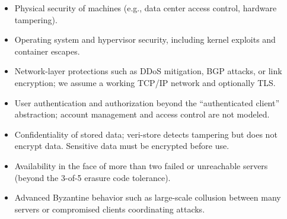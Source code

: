 \documentclass[../veristore_security_model.tex]{subfiles}
\begin{document}
\begin{itemize}
    \item Physical security of machines (e.g., data center access control, hardware tampering).
    \item Operating system and hypervisor security, including kernel exploits and container escapes.
    \item Network-layer protections such as DDoS mitigation, BGP attacks, or link encryption; we assume a working TCP/IP network and optionally TLS.
    \item User authentication and authorization beyond the ``authenticated client'' abstraction; account management and access control are not modeled.
    \item Confidentiality of stored data; veri-store detects tampering but does not encrypt data. Sensitive data must be encrypted before use.
    \item Availability in the face of more than two failed or unreachable servers (beyond the 3-of-5 erasure code tolerance).
    \item Advanced Byzantine behavior such as large-scale collusion between many servers or compromised clients coordinating attacks.
\end{itemize}

\newpage
\end{document}
